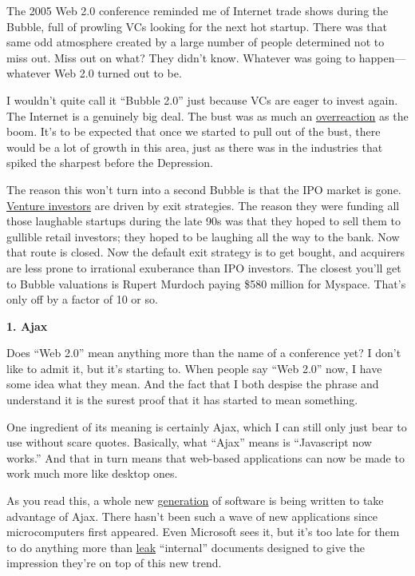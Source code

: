 \documentclass[12pt]{book}
\begin{document}
The 2005 Web 2.0 conference reminded me of Internet trade shows during
the Bubble, full of prowling VCs looking for the next hot startup. There
was that same odd atmosphere created by a large number of people
determined not to miss out. Miss out on what? They didn't know. Whatever
was going to happen---whatever Web 2.0 turned out to be.

I wouldn't quite call it ``Bubble 2.0'' just because VCs are eager to
invest again. The Internet is a genuinely big deal. The bust was as much
an \href{http://www.paulgraham.com/bubble.html}{overreaction} as the
boom. It's to be expected that once we started to pull out of the bust,
there would be a lot of growth in this area, just as there was in the
industries that spiked the sharpest before the Depression.

The reason this won't turn into a second Bubble is that the IPO market
is gone. \href{startupfunding.html}{Venture investors} are driven by
exit strategies. The reason they were funding all those laughable
startups during the late 90s was that they hoped to sell them to
gullible retail investors; they hoped to be laughing all the way to the
bank. Now that route is closed. Now the default exit strategy is to get
bought, and acquirers are less prone to irrational exuberance than IPO
investors. The closest you'll get to Bubble valuations is Rupert Murdoch
paying \$580 million for Myspace. That's only off by a factor of 10 or
so.

\textbf{1. Ajax}

Does ``Web 2.0'' mean anything more than the name of a conference yet? I
don't like to admit it, but it's starting to. When people say ``Web
2.0'' now, I have some idea what they mean. And the fact that I both
despise the phrase and understand it is the surest proof that it has
started to mean something.

One ingredient of its meaning is certainly Ajax, which I can still only
just bear to use without scare quotes. Basically, what ``Ajax'' means is
``Javascript now works.'' And that in turn means that web-based
applications can now be made to work much more like desktop ones.

As you read this, a whole new
\href{http://online.wsj.com/public/article/SB113098635587487074.html?mod=todays_\%20free_feature}{generation}
of software is being written to take advantage of Ajax. There hasn't
been such a wave of new applications since microcomputers first
appeared. Even Microsoft sees it, but it's too late for them to do
anything more than \href{http://www.hypercamp.org/2005/11/09}{leak}
``internal'' documents designed to give the impression they're on top of
this new trend.
\end{document}
